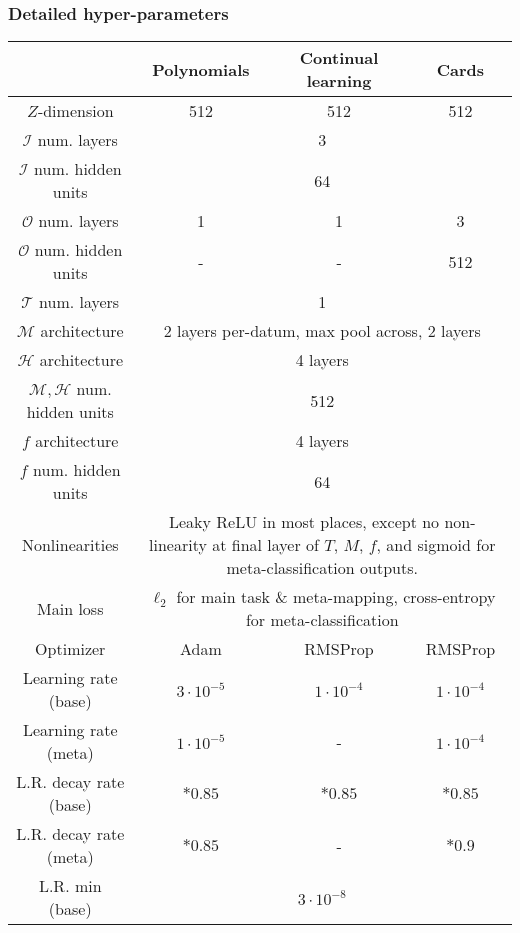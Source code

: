 \documentclass{article}
\begin{document}
\subsubsection{Detailed hyper-parameters}
\begin{table}
\centering
\begin{tabular}{|c||c|c|c|}
\hline 
& \phantom{bla}Polynomials\phantom{la} & Continual learning & \phantom{blahb}Cards\phantom{blahb} \\\hline
\hline
$Z$-dimension & 512 & 512 & 512 \\\hline
$\mathcal{I}$ num. layers & \multicolumn{3}{c|}{3} \\\hline 
$\mathcal{I}$ num. hidden units & \multicolumn{3}{c|}{64} \\\hline 
$\mathcal{O}$ num. layers & 1 & 1 & 3 \\\hline 
$\mathcal{O}$ num. hidden units & - & - & 512 \\\hline 
$\mathcal{T}$ num. layers & \multicolumn{3}{c|}{1} \\\hline 
$\mathcal{M}$ architecture & \multicolumn{3}{c|}{2 layers per-datum, max pool across, 2 layers} \\\hline 
$\mathcal{H}$ architecture & \multicolumn{3}{c|}{4 layers} \\\hline 
$\mathcal{M}, \mathcal{H}$ num. hidden units & \multicolumn{3}{c|}{512} \\\hline 
$f$ architecture & \multicolumn{3}{c|}{4 layers} \\\hline 
$f$ num. hidden units & \multicolumn{3}{c|}{64} \\\hline 
Nonlinearities & \multicolumn{3}{p{8.5cm}|}{Leaky ReLU in most places, except no non-linearity at final layer of $T$, $M$, $f$, and sigmoid for meta-classification outputs.} \\\hline
Main loss & \multicolumn{3}{p{8.5cm}|}{$\ell_2$ for main task \& meta-mapping, cross-entropy for meta-classification}\\\hline
\hline
Optimizer & Adam & RMSProp & RMSProp \\\hline
Learning rate (base) & $3\cdot 10^{-5}$ & $1\cdot 10^{-4}$ & $1\cdot 10^{-4}$\\\hline
Learning rate (meta) & $1\cdot 10^{-5}$ & - & $1\cdot 10^{-4}$\\\hline
L.R. decay rate (base) & $*0.85$ & $*0.85$ & $*0.85$ \\\hline
L.R. decay rate (meta) & $*0.85$ & - & $*0.9$ \\\hline
L.R. min (base) & \multicolumn{3}{c|}{$3 \cdot 10^{-8}$} \\\hline

\end{tabular}
\end{table}
\end{document}
